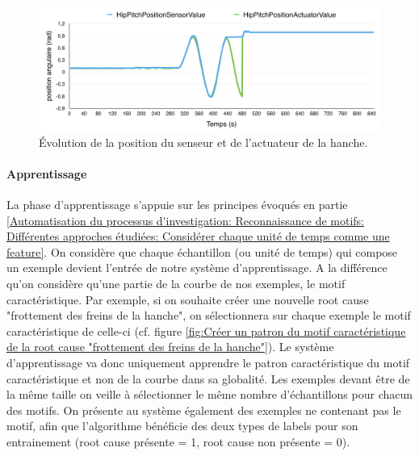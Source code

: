 \begin{figure}[h]
	\centering\includegraphics[width=12cm]{images/HipPitch.png}
	\caption[Évolution de la position du senseur et de l'actuateur de la hanche]{Évolution de la position du senseur et de l'actuateur de la hanche.}
	\label{fig:Évolution de la position du senseur et de l'actuateur de la hanche}
\end{figure}

\paragraph{Apprentissage} La phase d'apprentissage s'appuie sur les principes évoqués en partie \ref{Automatisation du processus d'investigation: Reconnaissance de motifs: Différentes approches étudiées: Considérer chaque unité de temps comme une feature}. On considère que chaque échantillon (ou unité de temps) qui compose un exemple devient l'entrée de notre système d'apprentissage. A la différence qu'on considère qu'une partie de la courbe de nos exemples, le motif caractéristique. Par exemple, si on souhaite créer une nouvelle root cause "frottement des freins de la hanche", on sélectionnera sur chaque exemple le motif caractéristique de celle-ci (cf. figure \ref{fig:Créer un patron du motif caractéristique de la root cause "frottement des freins de la hanche"}). Le système d'apprentissage va donc uniquement apprendre le patron caractéristique du motif caractéristique et non de la courbe dans sa globalité. Les exemples devant être de la même taille on veille à sélectionner le même nombre d'échantillons pour chacun des motifs. On présente au système également des exemples ne contenant pas le motif, afin que l'algorithme bénéficie des deux types de labels pour son entrainement (root cause présente = 1, root cause non présente = 0).

